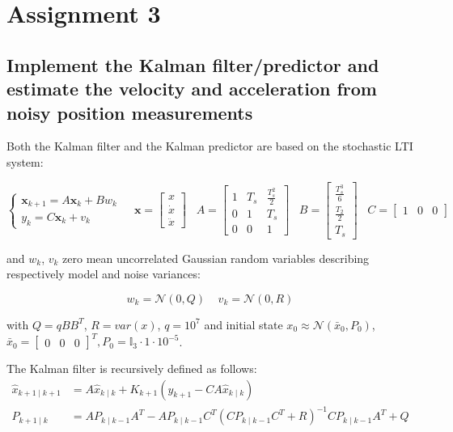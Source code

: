 \section{Assignment 3}
\label{ass3}
\subsection{Implement the Kalman filter/predictor and estimate the velocity and acceleration from noisy position measurements}

Both the Kalman filter and the Kalman predictor are based on the stochastic LTI system:

\begin{equation*}
\begin{cases}
\textbf{x}_{k+1}=A\textbf{x}_k+Bw_k\\
y_k=C\textbf{x}_k+v_k
\end{cases}\;\;\;\;\textbf{x}=\begin{bmatrix}
x\\\dot x\\\ddot x
\end{bmatrix}\;\;\;
A=\begin{bmatrix}
1 & T_s & \frac{T_s^2}{2}\\
0 & 1 & T_s\\
0 & 0 & 1
\end{bmatrix}\;\;\; B=\begin{bmatrix}
\frac{T_s^3}{6}\\\frac{T_2}{2}\\T_s
\end{bmatrix}\;\;\; C=\begin{bmatrix}
1 & 0 & 0
\end{bmatrix}
\end{equation*}

and $w_k$, $v_k$ zero mean uncorrelated Gaussian random variables describing respectively model and noise variances:

\begin{equation*}
w_k=\mathcal N(0,Q)\;\;\;\;v_k=\mathcal N(0,R)
\end{equation*}

with $Q=qBB^T$, $R=var(x)$, $q=10^7$ and initial state $x_0\approx\mathcal N(\bar x_0,P_0)$, $\bar x_0=\begin{bmatrix}
0 & 0 & 0
\end{bmatrix}^T, P_0=\mathbb{I}_3\cdot 1\cdot 10^{-5}$.

The Kalman filter is recursively defined as follows:
\begin{align*}
\hat x_{k+1\mid k+1}&=A\hat x_{k\mid k}+K_{k+1}(y_{k+1}-CA\hat x_{k\mid k})\\
P_{k+1\mid k}&=AP_{k\mid k-1}A^T-AP_{k\mid k-1}C^T(CP_{k\mid k-1}C^T+R)^{-1}CP_{k\mid k-1}A^T+Q
\end{align*}

